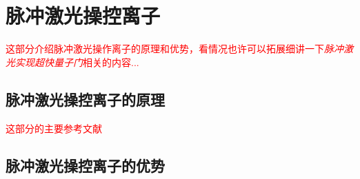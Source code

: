 
\chapter[脉冲激光操控离子]{脉冲激光操控离子}

\textcolor{red}{
这部分介绍脉冲激光操作离子的原理和优势，看情况也许可以拓展细讲一下\emph{脉冲激光实现超快量子门}相关的内容...
}

\section[脉冲激光操控离子的原理]{脉冲激光操控离子的原理}
\textcolor{red}{这部分的主要参考文献\cite[]{Hayes_Matsukevich_Maunz_Hucul_Quraishi_Olmschenk_Campbell_Mizrahi_Senko_Monroe_2010}}

\section[脉冲激光操控离子的优势]{脉冲激光操控离子的优势}


